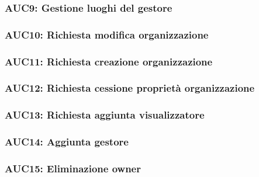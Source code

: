 \documentclass[../analisi-dei-requisiti.tex]{subfiles}
\begin{document}



\subsubsection{AUC9: Gestione luoghi del gestore}%
\label{subs:AUC9}



\subsubsection{AUC10: Richiesta modifica organizzazione}%
\label{subs:AUC10}



\subsubsection{AUC11: Richiesta creazione organizzazione}%
\label{subs:AUC11}



\subsubsection{AUC12: Richiesta cessione proprietà organizzazione}%
\label{subs:AUC12}



\subsubsection{AUC13: Richiesta aggiunta visualizzatore}%
\label{subs:AUC13}



\subsubsection{AUC14: Aggiunta gestore}%
\label{subs:AUC14}



\subsubsection{AUC15: Eliminazione owner}%
\label{subs:AUC15}
\end{document}
